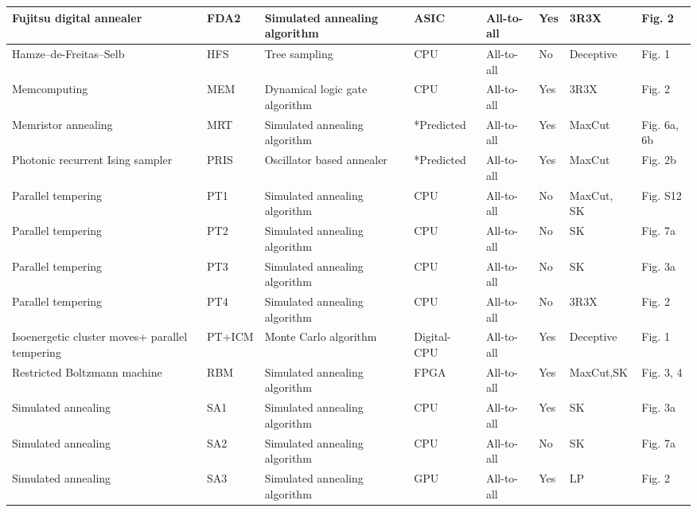 \documentclass[fleqn,10pt]{wlscirep}
\def\change#1{#1}
\begin{document}
\begin{table}
{\begin{tabular}{|l|l|l|l|l|l|l|l|}
   \hline
\change{Fujitsu digital annealer} &  FDA2 & Simulated annealing algorithm &  ASIC &  All-to-all & Yes & 3R3X & Fig. 2 \cite{kowalsky20213}  \\
   \hline
\change{Hamze–de-Freitas–Selb} &  HFS &Tree sampling &  CPU &  All-to-all & No & Deceptive & Fig. 1\cite{mandra2018deceptive}  \\
   \hline
\change{Memcomputing} & MEM  & Dynamical logic gate algorithm & \change{CPU} & All-to-all &  Yes &  3R3X & Fig. 2 \cite{kowalsky20213} \\
   \hline 
   Memristor annealing  & MRT &   Simulated annealing algorithm & \change{*Predicted} &  All-to-all  & Yes & MaxCut &  Fig. 6a, 6b  \cite{cai2020power} \\
   \hline
       Photonic recurrent Ising sampler & PRIS &     Oscillator based annealer & \change{*Predicted} &  All-to-all   &  Yes & MaxCut & Fig. 2b \cite{roques2020heuristic} \\
          \hline
    Parallel tempering  & PT1 &  Simulated annealing algorithm &  CPU &  All-to-all & No & MaxCut, SK & Fig. S12 \cite{hamerly2019experimental} \\
   \hline
     Parallel tempering & PT2 &   Simulated annealing algorithm &  CPU & All-to-all & No  &  SK & Fig. 7a \cite{aramon2019physics} \\
   \hline
     Parallel tempering & PT3 &   Simulated annealing algorithm &  CPU &  All-to-all & No & SK & Fig. 3a \cite{leleu2020chaotic} \\
 \hline
      \change{Parallel tempering} & PT4 &   Simulated annealing algorithm & CPU &  All-to-all & No & 3R3X & Fig. 2 \cite{kowalsky20213}\\
  \hline
    \change{Isoenergetic cluster moves+ parallel tempering} & PT+ICM & Monte Carlo algorithm & Digital- CPU & All-to-all & Yes &  Deceptive & Fig. 1 \cite{mandra2018deceptive} \\
 \hline
     Restricted Boltzmann machine & RBM &  Simulated annealing algorithm &  FPGA & All-to-all & Yes &  MaxCut,SK & Fig. 3, 4 \cite{patel2020ising} \\
        \hline
       Simulated annealing & SA1 &    Simulated annealing algorithm &  CPU & All-to-all & Yes &   SK & Fig. 3a \cite{leleu2020chaotic} \\
   \hline
     Simulated annealing & SA2 &     Simulated annealing algorithm &  CPU & All-to-all &  No  &  SK & Fig. 7a \cite{aramon2019physics} \\
   \hline
        Simulated annealing     & SA3 &  Simulated annealing algorithm &  GPU & All-to-all &  Yes  &  LP & Fig. 2  \cite{albash2018demonstration} \\

\end{tabular}}
\end{table}
\end{document}
